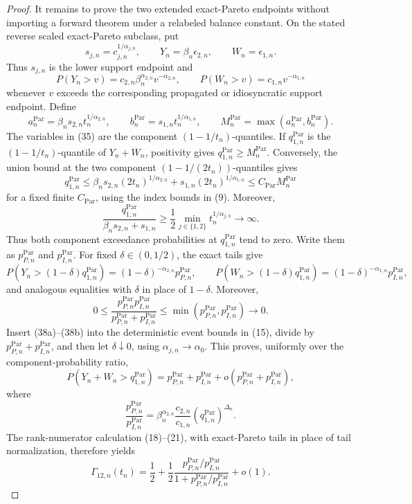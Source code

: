 \documentclass{article}
\begin{document}
\begin{proof}
It remains to prove the two extended exact-Pareto endpoints without importing
a forward theorem under a relabeled balance constant. On the stated reverse
scaled exact-Pareto subclass, put
\[
s_{j,n}=c_{j,n}^{1/\alpha_{j,n}},
\qquad
Y_n=\beta_n\epsilon_{2,n},
\qquad
W_n=\epsilon_{1,n}.
\tag{33}
\]
Thus \(s_{j,n}\) is the lower support endpoint and
\[
P(Y_n>v)=c_{2,n}\beta_n^{\alpha_{2,n}}v^{-\alpha_{2,n}},
\qquad
P(W_n>v)=c_{1,n}v^{-\alpha_{1,n}}
\tag{34}
\]
whenever \(v\) exceeds the corresponding propagated or idiosyncratic support
endpoint. Define
\[
a_n^{\mathrm{Par}}=\beta_n s_{2,n}t_n^{1/\alpha_{2,n}},
\qquad
b_n^{\mathrm{Par}}=s_{1,n}t_n^{1/\alpha_{1,n}},
\qquad
M_n^{\mathrm{Par}}=\max(a_n^{\mathrm{Par}},b_n^{\mathrm{Par}}).
\tag{35}
\]
The variables in (35) are the component \((1-1/t_n)\)-quantiles. If
\(q_{1,n}^{\mathrm{Par}}\) is the \((1-1/t_n)\)-quantile of \(Y_n+W_n\),
positivity gives \(q_{1,n}^{\mathrm{Par}}\geq M_n^{\mathrm{Par}}\). Conversely,
the union bound at the two component \((1-1/(2t_n))\)-quantiles gives
\[
q_{1,n}^{\mathrm{Par}}
\leq\beta_n s_{2,n}(2t_n)^{1/\alpha_{2,n}}
+s_{1,n}(2t_n)^{1/\alpha_{1,n}}
\leq C_{\mathrm{Par}}M_n^{\mathrm{Par}}
\tag{36}
\]
for a fixed finite \(C_{\mathrm{Par}}\), using the index bounds in (9).
Moreover,
\[
\frac{q_{1,n}^{\mathrm{Par}}}{\beta_n s_{2,n}+s_{1,n}}
\geq\frac12\min_{j\in\{1,2\}}t_n^{1/\alpha_{j,n}}
\longrightarrow\infty.
\tag{37}
\]
Thus both component exceedance probabilities at
\(q_{1,n}^{\mathrm{Par}}\) tend to zero. Write them as
\(p_{P,n}^{\mathrm{Par}}\) and \(p_{I,n}^{\mathrm{Par}}\). For fixed
\(\delta\in(0,1/2)\), the exact tails give
\[
P(Y_n>(1-\delta)q_{1,n}^{\mathrm{Par}})
=(1-\delta)^{-\alpha_{2,n}}p_{P,n}^{\mathrm{Par}},
\qquad
P(W_n>(1-\delta)q_{1,n}^{\mathrm{Par}})
=(1-\delta)^{-\alpha_{1,n}}p_{I,n}^{\mathrm{Par}},
\tag{38a}
\]
and analogous equalities with \(\delta\) in place of \(1-\delta\).
Moreover,
\[
0\leq
\frac{p_{P,n}^{\mathrm{Par}}p_{I,n}^{\mathrm{Par}}}
{p_{P,n}^{\mathrm{Par}}+p_{I,n}^{\mathrm{Par}}}
\leq\min(p_{P,n}^{\mathrm{Par}},p_{I,n}^{\mathrm{Par}})\longrightarrow0.
\tag{38b}
\]
Insert (38a)--(38b) into the deterministic event bounds in (15), divide by
\(p_{P,n}^{\mathrm{Par}}+p_{I,n}^{\mathrm{Par}}\), and then let
\(\delta\downarrow0\), using \(\alpha_{j,n}\to\alpha_0\). This proves,
uniformly over the component-probability ratio,
\[
P(Y_n+W_n>q_{1,n}^{\mathrm{Par}})
=p_{P,n}^{\mathrm{Par}}+p_{I,n}^{\mathrm{Par}}
+o(p_{P,n}^{\mathrm{Par}}+p_{I,n}^{\mathrm{Par}}),
\tag{38}
\]
where
\[
\frac{p_{P,n}^{\mathrm{Par}}}{p_{I,n}^{\mathrm{Par}}}
=\beta_n^{\alpha_{2,n}}\frac{c_{2,n}}{c_{1,n}}
(q_{1,n}^{\mathrm{Par}})^{\Delta_n}.
\tag{39}
\]
The rank-numerator calculation (18)--(21), with exact-Pareto tails in place of
tail normalization, therefore yields
\[
\Gamma_{12,n}(t_n)
=\frac12+\frac12
\frac{p_{P,n}^{\mathrm{Par}}/p_{I,n}^{\mathrm{Par}}}
{1+p_{P,n}^{\mathrm{Par}}/p_{I,n}^{\mathrm{Par}}}+o(1).
\tag{40}
\]


\end{proof}
\end{document}
